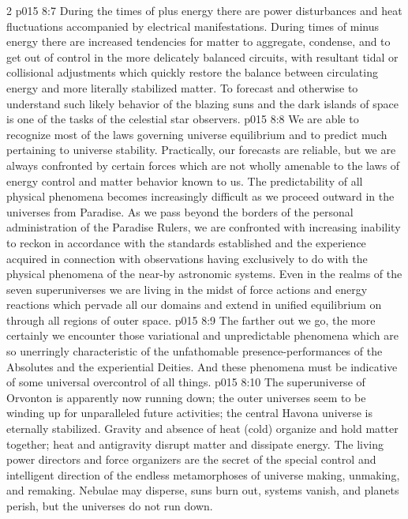 \begin{multicols}{2}
\vs p015 8:7 During the times of plus energy there are power disturbances and heat fluctuations accompanied by electrical manifestations. During times of minus energy there are increased tendencies for matter to aggregate, condense, and to get out of control in the more delicately balanced circuits, with resultant tidal or collisional adjustments which quickly restore the balance between circulating energy and more literally stabilized matter. To forecast and otherwise to understand such likely behavior of the blazing suns and the dark islands of space is one of the tasks of the celestial star observers.
\vs p015 8:8 We are able to recognize most of the laws governing universe equilibrium and to predict much pertaining to universe stability. Practically, our forecasts are reliable, but we are always confronted by certain forces which are not wholly amenable to the laws of energy control and matter behavior known to us. The predictability of all physical phenomena becomes increasingly difficult as we proceed outward in the universes from Paradise. As we pass beyond the borders of the personal administration of the Paradise Rulers, we are confronted with increasing inability to reckon in accordance with the standards established and the experience acquired in connection with observations having exclusively to do with the physical phenomena of the near\hyp{}by astronomic systems. Even in the realms of the seven superuniverses we are living in the midst of force actions and energy reactions which pervade all our domains and extend in unified equilibrium on through all regions of outer space.
\vs p015 8:9 The farther out we go, the more certainly we encounter those variational and unpredictable phenomena which are so unerringly characteristic of the unfathomable presence\hyp{}performances of the Absolutes and the experiential Deities. And these phenomena must be indicative of some universal overcontrol of all things.
\vs p015 8:10 The superuniverse of Orvonton is apparently now running down; the outer universes seem to be winding up for unparalleled future activities; the central Havona universe is eternally stabilized. Gravity and absence of heat (cold) organize and hold matter together; heat and antigravity disrupt matter and dissipate energy. The living power directors and force organizers are the secret of the special control and intelligent direction of the endless metamorphoses of universe making, unmaking, and remaking. Nebulae may disperse, suns burn out, systems vanish, and planets perish, but the universes do not run down.

\end{multicols}
